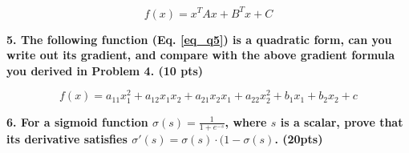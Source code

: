 \documentclass{article}
\begin{document}
\begin{equation}
    f(x) = x^T A x + B^T x + C
    \label{eq_q4}
\end{equation}


\textbf{5. The following function (Eq. \ref{eq_q5}) is a quadratic form, can you write out its gradient, and compare with the above gradient formula you derived in Problem 4. (10 pts)}

\begin{equation}
    f(x) = a_{11}x_1^2 + a_{12}x_1 x_2 + a_{21}x_2 x_1 + a_{22} x_2^2 + b_1 x_1 + b_2 x_2 + c
    \label{eq_q5}
\end{equation}

\textbf{6. For a sigmoid function $\sigma (s)=\frac{1}{1+e^{-s}}$, where $s$ is a scalar, prove that its derivative satisfies $\sigma ' (s) = \sigma(s) \cdot (1-\sigma (s)$. (20pts)}\\
\end{document}
